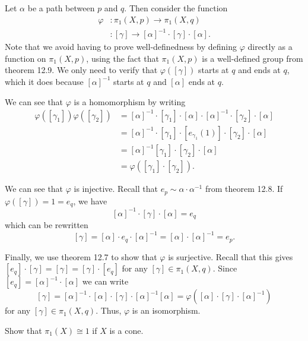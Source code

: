 \documentclass[12 pt, letterpaper]{hmcpset}
\begin{document}
\begin{solution}
	Let $\alpha$ be a path between $p$ and $q$. Then consider the function
	\begin{align*}
		\varphi & : \pi_{1}(X, p) \to \pi_{1}(X, q) \\
				 & : [\gamma] \to [\alpha]^{-1} \cdot [\gamma] \cdot [\alpha].
	\end{align*}
	Note that we avoid having to prove well-definedness by defining $\varphi$ directly as a function on $\pi_{1}(X, p)$, using the fact that $\pi_{1}(X, p)$ is a well-defined group from theorem 12.9. We only need to verify that $\varphi([\gamma])$ starts at $q$ and ends at $q$, which it does because $[\alpha]^{-1}$ starts at $q$ and $[\alpha]$ ends at $q$.

	We can see that $\varphi$ is a homomorphism by writing
	\begin{align*}
		\varphi([\gamma_{1}]) \varphi([\gamma_{2}]) & = [\alpha]^{-1} \cdot [\gamma_{1}] \cdot [\alpha] \cdot [\alpha]^{-1} \cdot [\gamma_{2}] \cdot [\alpha] \\
							    & = [\alpha]^{-1} \cdot [\gamma_{1}] \cdot [e_{\gamma_{1}}(1)] \cdot [\gamma_{2}] \cdot [\alpha] \\
							    & = [\alpha]^{-1} [\gamma_{1}] \cdot [\gamma_{2}] \cdot [\alpha] \\
							    & = \varphi([\gamma_{1}] \cdot [\gamma_{2}]).
	\end{align*}

	We can see that $\varphi$ is injective. Recall that $e_{p} \sim \alpha \cdot \alpha^{-1}$ from theorem 12.8. If $\varphi([\gamma]) = 1 =  e_{q}$, we have
	\[
		[\alpha]^{-1} \cdot [\gamma] \cdot [\alpha] = e_{q}
	\]
	which can be rewritten
	\[
		[\gamma] = [\alpha] \cdot e_{q} \cdot [\alpha]^{-1} = [\alpha] \cdot [\alpha]^{-1} = e_{p}.
	\]

	Finally, we use theorem 12.7 to show that $\varphi$ is surjective. Recall that this gives $[e_{q}] \cdot [\gamma] = [\gamma] = [\gamma] \cdot [e_{q}]$ for any $[\gamma] \in \pi_{1}(X, q)$. Since $[e_{q}] = [\alpha]^{-1} \cdot [\alpha]$ we can write
	\[
		[\gamma] = [\alpha]^{-1} \cdot [\alpha] \cdot [\gamma] \cdot [\alpha]^{-1} [\alpha] = \varphi([\alpha] \cdot [\gamma] \cdot [\alpha]^{-1})
	\]
	for any $[\gamma] \in \pi_{1}(X, q)$. Thus, $\varphi$ is an isomorphism.
\end{solution}

\pagebreak

\begin{problem}[12.13 (4)]
	Show that $\pi_{1}(X) \cong 1$ if $X$ is a cone.
\end{problem}
\end{document}
